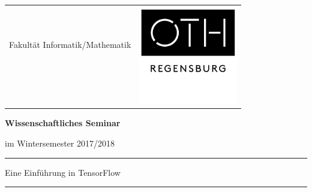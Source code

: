 ﻿%

\noindent \titlepage

\noindent \begin{center}
\begin{tabular}{cc}
 & \multirow{5}{*}{\includegraphics[height=4.3cm]{images/OTH_Regensburg_neues_Logo_01}}\tabularnewline
{\large{}Fakultät Informatik/Mathematik}\hspace{3.0cm} & \tabularnewline
 & \tabularnewline
 & \tabularnewline
 & \tabularnewline
\end{tabular}
\par\end{center}

\noindent \vspace{2.0cm}


\begin{center}
\textbf{\Large{Wissenschaftliches Seminar}}
\par\end{center}{\Large \par}
\begin{center}
im Wintersemester 2017/2018
\end{center}

\noindent
\rule{\textwidth}{0.3pt}

\begin{doublespace}
\noindent \begin{center}
\Large{Eine Einführung in TensorFlow}
\par\end{center}{\large \par}
\end{doublespace}
\noindent\rule{\textwidth}{0.3pt}


\vspace{1.3cm}

\noindent \begin{flushleft}
{\Large{}
}
\par\end{flushleft}{\Large \par}

